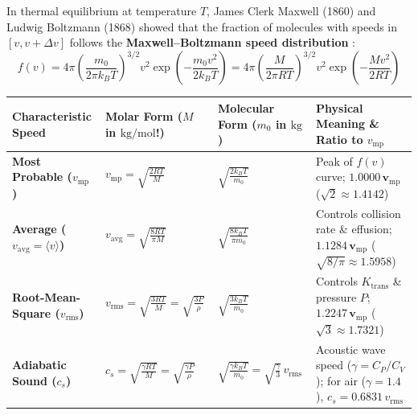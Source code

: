 In thermal equilibrium at temperature $T$, James Clerk Maxwell (1860) and Ludwig Boltzmann (1868) showed that the fraction of molecules with speeds in $[v, v+\Delta v]$ follows the \textbf{Maxwell--Boltzmann speed distribution} :
\begin{equation}\label{eq:06:mb-dist}
  f(v) = 4\pi\left(\frac{m_0}{2\pi k_B T}\right)^{3/2} v^2 \exp\left(-\frac{m_0 v^2}{2k_B T}\right) = 4\pi\left(\frac{M}{2\pi R T}\right)^{3/2} v^2 \exp\left(-\frac{M v^2}{2 R T}\right)
\end{equation}

\begin{formulacard}
\par\smallskip\noindent
\footnotesize
\begin{tabularx}{\linewidth}{@{}l l l X@{}}
\toprule
\textbf{Characteristic Speed} & \textbf{Molar Form ($M$ in $\si{\kilogram\per\mole}$!)} & \textbf{Molecular Form ($m_0$ in $\si{\kilogram}$)} & \textbf{Physical Meaning \& Ratio to $v_{\mathrm{mp}}$} \\
\midrule
\textbf{Most Probable ($v_{\mathrm{mp}}$)} & $\displaystyle v_{\mathrm{mp}} = \sqrt{\frac{2RT}{M}}$ & $\displaystyle \sqrt{\frac{2k_B T}{m_0}}$ & Peak of $f(v)$ curve; $\mathbf{1.0000\,v_{\mathrm{mp}}}$ ($\sqrt{2} \approx 1.4142$) \\[6pt]
\textbf{Average ($v_{\mathrm{avg}} = \langle v\rangle$)} & $\displaystyle v_{\mathrm{avg}} = \sqrt{\frac{8RT}{\pi M}}$ & $\displaystyle \sqrt{\frac{8k_B T}{\pi m_0}}$ & Controls collision rate \& effusion; $\mathbf{1.1284\,v_{\mathrm{mp}}}$ ($\sqrt{8/\pi} \approx 1.5958$) \\[6pt]
\textbf{Root-Mean-Square ($v_{\mathrm{rms}}$)} & $\displaystyle v_{\mathrm{rms}} = \sqrt{\frac{3RT}{M}} = \sqrt{\frac{3P}{\rho}}$ & $\displaystyle \sqrt{\frac{3k_B T}{m_0}}$ & Controls $K_{\mathrm{trans}}$ \& pressure $P$; $\mathbf{1.2247\,v_{\mathrm{mp}}}$ ($\sqrt{3} \approx 1.7321$) \\[6pt]
\textbf{Adiabatic Sound ($c_s$)} & $\displaystyle c_s = \sqrt{\frac{\gamma RT}{M}} = \sqrt{\frac{\gamma P}{\rho}}$ & $\displaystyle \sqrt{\frac{\gamma k_B T}{m_0}} = \sqrt{\frac{\gamma}{3}}\,v_{\mathrm{rms}}$ & Acoustic wave speed ($\gamma = C_P/C_V$); for air ($\gamma=1.4$), $c_s = 0.6831\,v_{\mathrm{rms}}$ \\
\bottomrule
\end{tabularx}

\end{formulacard}
